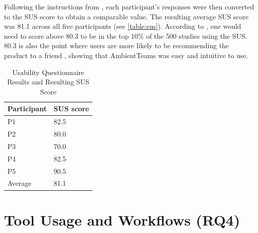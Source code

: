 Following the instructions from \textcite{sauroSUS}, each participant's responses were then converted to the SUS score to obtain a comparable value. The resulting average SUS score was 81.1 across all five participants (see \autoref{table:sus}). According to \textcite{sauroSUS}, one would need to score above 80.3 to be in the top 10\% of the 500 studies using the SUS. 80.3 is also the point where users are more likely to be recommending the product to a friend \autocite{sauroSUS}, showing that AmbientTeams was easy and intuitive to use.

\begin{table}[h] \footnotesize
    \centering
    \begin{tabularx}{.35\textwidth}{X X}
        \toprule
        Participant & SUS score \\
        \midrule
        P1          & 82.5      \\
        P2          & 80.0      \\
        P3          & 70.0      \\
        P4          & 82.5      \\
        P5          & 90.5      \\
        \midrule
        Average     & 81.1      \\
        \bottomrule
    \end{tabularx}
    \caption{Usability Questionnaire Results and Resulting SUS Score}
    \label{table:sus}
\end{table}

\section{Tool Usage and Workflows (RQ4)}
\label{section:tool_usage_and_workflows}


